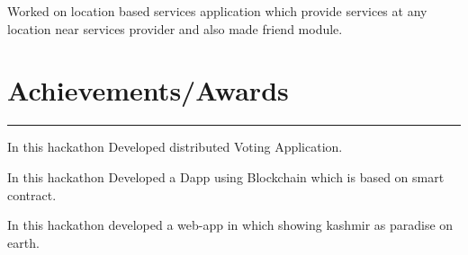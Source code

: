 \documentclass[localFont,alternative,10pt,compact]{main}
\begin{document}
\begin{minipage}[t]{0.66\textwidth}
         
        \noindent
        \hspace{5em}%
        \begin{minipage}{0.85\textwidth\vspace{2pt}}
            Worked on location based services application which provide services at any location near
            services provider and also made friend module.
        \end{minipage}


        \section{Achievements/Awards}
        \noindent\rule{12.5cm}{0.4pt}
         
        \noindent
        \hspace{5em}%
        \begin{minipage}{0.85\textwidth\vspace{2pt}}
            In this hackathon Developed distributed Voting Application.
        \end{minipage}
         
        \noindent
        \hspace{5em}%
        \begin{minipage}{0.85\textwidth\vspace{2pt}}
            In this hackathon Developed a Dapp using Blockchain which is based on smart contract.
        \end{minipage}
         
        \noindent
        \hspace{5em}%
        \begin{minipage}{0.85\textwidth\vspace{2pt}}
            In this hackathon developed a web-app in which showing kashmir as paradise on earth.
        \end{minipage}



\end{minipage}
\end{document}
